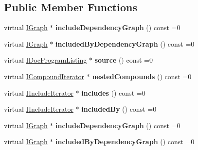 \subsection*{Public Member Functions}
\begin{DoxyCompactItemize}
\item 
\mbox{\label{class_i_file_ac97002d816cf58d5ae3f4bb6c1613009}} 
virtual \mbox{\hyperlink{class_i_graph}{I\+Graph}} $\ast$ {\bfseries include\+Dependency\+Graph} () const =0
\item 
\mbox{\label{class_i_file_a2df1b13df5eda075c61caffff75d752c}} 
virtual \mbox{\hyperlink{class_i_graph}{I\+Graph}} $\ast$ {\bfseries included\+By\+Dependency\+Graph} () const =0
\item 
\mbox{\label{class_i_file_a42f0e209d24164d453ce0d35369611e4}} 
virtual \mbox{\hyperlink{class_i_doc_program_listing}{I\+Doc\+Program\+Listing}} $\ast$ {\bfseries source} () const =0
\item 
\mbox{\label{class_i_file_aa163ae8b90e271b05f0e86258e19b8fc}} 
virtual \mbox{\hyperlink{class_i_compound_iterator}{I\+Compound\+Iterator}} $\ast$ {\bfseries nested\+Compounds} () const =0
\item 
\mbox{\label{class_i_file_a142adec80ea4898ab11d4426852f9d03}} 
virtual \mbox{\hyperlink{class_i_include_iterator}{I\+Include\+Iterator}} $\ast$ {\bfseries includes} () const =0
\item 
\mbox{\label{class_i_file_ab6da8519b4cbbc887ab61599f8f27659}} 
virtual \mbox{\hyperlink{class_i_include_iterator}{I\+Include\+Iterator}} $\ast$ {\bfseries included\+By} () const =0
\item 
\mbox{\label{class_i_file_ac97002d816cf58d5ae3f4bb6c1613009}} 
virtual \mbox{\hyperlink{class_i_graph}{I\+Graph}} $\ast$ {\bfseries include\+Dependency\+Graph} () const =0
\item 
\mbox{\label{class_i_file_a2df1b13df5eda075c61caffff75d752c}} 
virtual \mbox{\hyperlink{class_i_graph}{I\+Graph}} $\ast$ {\bfseries included\+By\+Dependency\+Graph} () const =0
\item 
\mbox{\label{class_i_file_a42f0e209d24164d453ce0d35369611e4}} 

\end{DoxyCompactItemize}
